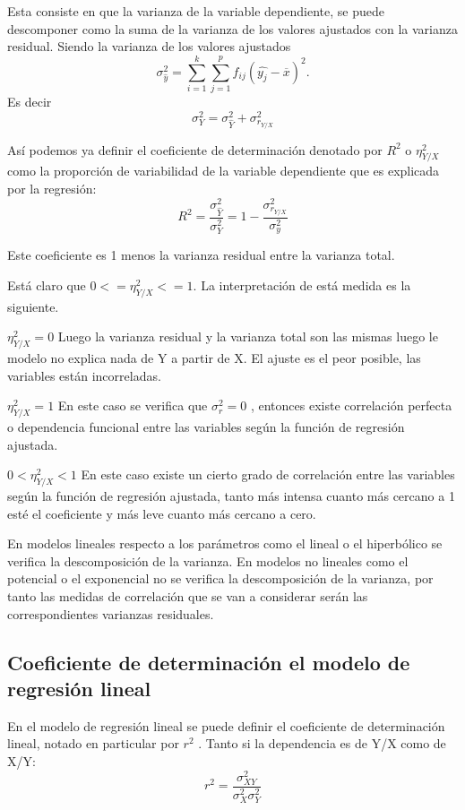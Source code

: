 \documentclass{article}
\begin{document}
	\vspace{2mm}
	
	Esta consiste en que la varianza de la variable dependiente, se puede descomponer como la suma de la varianza de los valores ajustados con la varianza residual. Siendo la varianza de los valores ajustados $$\sigma_{\hat{y}}^2 = \sum_{i=1}^k \sum_{j=1}^p f_{ij} (\hat{y_j} - \overline{x} )^2. $$
Es decir
	$$ \sigma_Y^2 = \sigma_{\hat{Y}}^2 + \sigma_{r_{Y/X}}^2 $$
	
	
	Así podemos ya definir el coeficiente de determinación denotado por $R^2$ o $\eta_{Y/X}^2$ como la proporción de variabilidad de la variable dependiente que es explicada por la regresión: $$R^2 = \frac{\sigma_{\hat{Y}}^2}{\sigma_Y^2}  = 1 - \frac{\sigma_{r_{Y/X}}^2}{\sigma_y^2}$$
	
	Este coeficiente es 1 menos la varianza residual entre la varianza total.
	
	Está claro que $ 0 <= \eta_{Y/X}^2  <= 1 $. La interpretación de está medida es la siguiente.
	
\vspace{2mm}	
	
	$ \eta_{Y/X}^2 = 0 $ Luego la varianza residual y la varianza total son las mismas luego le modelo no explica nada de Y a partir de X. El ajuste es el peor posible, las variables están incorreladas.
	
\vspace{2mm}	
	
	$ \eta_{Y/X}^2 = 1 $ En este caso se verifica que $\sigma_r^2 = 0$ , entonces existe correlación perfecta o dependencia funcional entre las variables según la función de regresión ajustada.	
	
\vspace{2mm}	
	
	$ 0 < \eta_{Y/X}^2 < 1 $  En este caso existe un cierto grado de correlación entre las variables según la función de regresión ajustada, tanto más intensa cuanto más cercano a 1 esté el coeficiente y más leve cuanto más cercano a cero.
	
En modelos lineales respecto a los parámetros como el lineal o el hiperbólico se verifica la descomposición de la varianza. En modelos no lineales como el potencial o el exponencial no se verifica la descomposición de la varianza, por tanto las medidas de correlación que se van a considerar serán las correspondientes varianzas residuales.


\subsection{Coeficiente de determinación el modelo de regresión lineal}
En el modelo de regresión lineal se puede definir el coeficiente de determinación lineal, notado en particular por $r^2$ . Tanto si la dependencia es de Y/X como de X/Y:
$$ r^2 = \frac{\sigma_{XY}^2}{ \sigma_{X}^2 \sigma_{Y}^2 } $$
\end{document}
